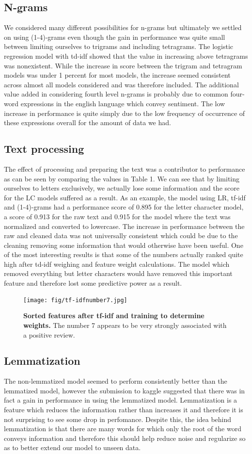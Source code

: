 \documentclass{amsart}
\theoremstyle{definition}
\theoremstyle{remark}
\numberwithin{equation}{section}
\begin{document}
\subsection{N-grams}
We considered many different possibilities for n-grams but ultimately we settled on using (1-4)-grams even though the gain in performance was quite small between limiting ourselves to trigrams and including tetragrams.  The logistic regression model with td-idf showed that the value in increasing above tetragrams was nonexistent.  While the increase in score between the trigram and tetragram models was under 1 percent for most models, the increase seemed consistent across almost all models considered and was therefore included.  The additional value added in considering fourth level n-grams is probably due to common four-word expressions in the english language which convey sentiment.  The low increase in performance is quite simply due to the low frequency of occurrence of these expressions overall for the amount of data we had.
\subsection{Text processing}
The effect of processing and preparing the text was a contributor to performance as can be seen by comparing the values in Table 1.  We can see that by limiting ourselves to letters exclusively, we actually lose some information and the score for the LC models suffered as a result.  As an example, the model using LR, tf-idf and (1-4)-grams had a performance score of 0.895 for the letter character model, a score of 0.913 for the raw text and 0.915 for the model where the text was normalized and converted to lowercase.  The increase in performance between the raw and cleaned data was not universally consistent which could be due to the cleaning removing some information that would otherwise have been useful.  One of the most interesting results is that some of the numbers actually ranked quite high after td-idf weighing and feature weight calculations.  The model which removed everything but letter characters would have removed this important feature and therefore lost some predictive power as a result.
\begin{figure}
	\centering
	\texttt{[image: fig/tf-idfnumber7.jpg]}
	\caption{\textbf{Sorted features after tf-idf and training to determine weights.} The number 7 appears to be very strongly associated with a positive review.}
	\label{fig:tfidfnumber7}
\end{figure}
\subsection{Lemmatization}
The non-lemmatized model seemed to perform consistently better than the lemmatized model, however the submission to kaggle suggested that there was in fact a gain in performance in using the lemmatized model.  Lemmatization is a feature which reduces the information rather than increases it and therefore it is not surprising to see some drop in perfomance.  Despite this, the idea behind lemmatization is that there are many words for which only the root of the word conveys information and therefore this should help reduce noise and regularize so as to better extend our model to unseen data.
\end{document}
